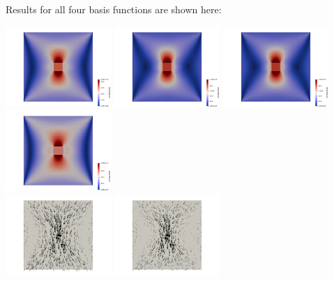Results for all four basis functions are shown here:
\begin{center}
\includegraphics[width=4cm]{python_codes/fieldstone_77/results/block/full/vel1}
\includegraphics[width=4cm]{python_codes/fieldstone_77/results/block/full/vel2}
\includegraphics[width=4cm]{python_codes/fieldstone_77/results/block/full/vel3}
\includegraphics[width=4cm]{python_codes/fieldstone_77/results/block/full/vel4}\\
\includegraphics[width=4cm]{python_codes/fieldstone_77/results/block/full/vels1}
\includegraphics[width=4cm]{python_codes/fieldstone_77/results/block/full/vels2}

\end{center}
